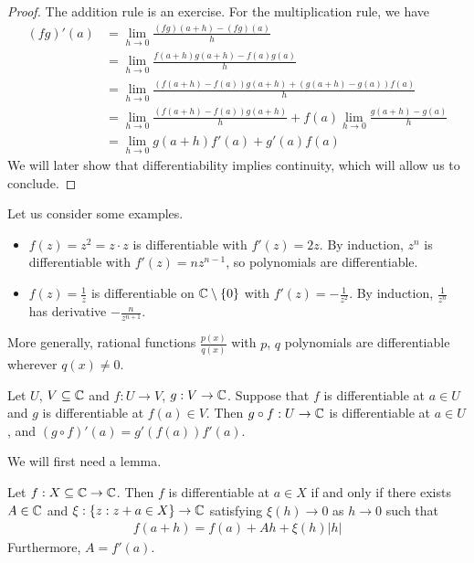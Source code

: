 \documentclass{../../template/note}
\begin{document}
    \begin{proof}
        The addition rule is an exercise. For the multiplication rule, we have
        \begin{align*}
            (fg)'(a) &= \lim_{h \to 0} \frac{(fg)(a+h) - (fg)(a)}{h} \\
            &= \lim_{h \to 0} \frac{f(a+h)g(a+h)-f(a)g(a)}{h} \\
            &= \lim_{h \to 0} \frac{\left(f(a+h)-f(a)\right)g(a+h) + \left(g(a+h)-g(a)\right)f(a)}{h} \\
            &= \lim_{h \to 0} \frac{\left(f(a+h)-f(a)\right)g(a+h)}{h} + f(a)\lim_{h \to 0} \frac{g(a+h)-g(a)}{h} \\
            &= \lim_{h \to 0} g(a+h) f'(a) + g'(a)f(a)
        \end{align*}
        We will later show that differentiability implies continuity, which will allow us to conclude.
    \end{proof}    

    \begin{example*}
        Let us consider some examples.
        \begin{itemize}
            \item \(f(z) = z^2 = z \cdot z\) is differentiable with \(f'(z) = 2z\). By induction, \(z^n\) is differentiable with \(f'(z) = nz^{n-1}\), so polynomials are differentiable.
            \item \(f(z) = \frac 1 z\) is differentiable on \(\mathbb C \setminus \{0\}\) with \(f'(z) = -\frac 1 {z^2}\). By induction, \(\frac 1 {z^n}\) has derivative \(-\frac n {z^{n+1}}\).
        \end{itemize}
        More generally, rational functions \(\frac{p(x)}{q(x)}\) with \(p\), \(q\) polynomials are differentiable wherever \(q(x) \neq 0\).        
    \end{example*}

    
    \begin{proposition}
        Let \(U\), \(V \subseteq \mathbb C\) and \(f: U \to V\), \(g: V \to \mathbb C\). Suppose that \(f\) is differentiable at \(a \in U\) and \(g\) is differentiable at \(f(a) \in V\). Then \(g \circ f: U \to \mathbb C\) is differentiable at \(a \in U\), and \((g \circ f)'(a) = g'(f(a))f'(a)\).
    \end{proposition}
    
    We will first need a lemma.

    \begin{lemma}
        \label{little-o-derivative}
        Let \(f: X \subseteq \mathbb C \to \mathbb C\). Then \(f\) is differentiable at \(a \in X\) if and only if there exists \(A \in \mathbb C\) and \(\xi: \{z: z + a \in X\} \to \mathbb C\) satisfying \(\xi(h) \to 0\) as \(h \to 0\) such that
        \begin{align*}
            f(a+h) = f(a) + Ah + \xi(h)|h|
        \end{align*}
        Furthermore, \(A = f'(a)\).
    \end{lemma}
    
\end{document}

